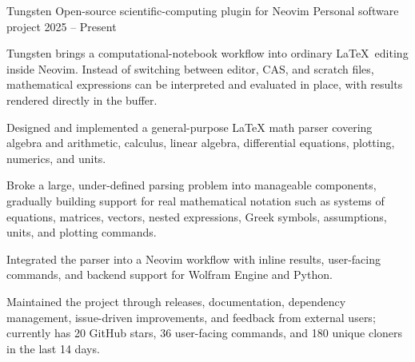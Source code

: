 \projectentry
  {Tungsten}
  {Open-source scientific-computing plugin for Neovim}
  {Personal software project}
  {2025 -- Present}
  {  \portfoliotag{\LaTeX}   }
  {\tungstenfigure}
  {Tungsten brings a computational-notebook workflow into ordinary \LaTeX\ editing inside Neovim. Instead of switching between editor, CAS, and scratch files, mathematical expressions can be interpreted and evaluated in place, with results rendered directly in the buffer.

  \begin{projectbullets}
    \item Designed and implemented a general-purpose LaTeX math parser covering algebra and arithmetic, calculus, linear algebra, differential equations, plotting, numerics, and units.
    \item Broke a large, under-defined parsing problem into manageable components, gradually building support for real mathematical notation such as systems of equations, matrices, vectors, nested expressions, Greek symbols, assumptions, units, and plotting commands.
    \item Integrated the parser into a Neovim workflow with inline results, user-facing commands, and backend support for Wolfram Engine and Python.
    \item Maintained the project through releases, documentation, dependency management, issue-driven improvements, and feedback from external users; currently has 20 GitHub stars, 36 user-facing commands, and 180 unique cloners in the last 14 days.
  \end{projectbullets}}

\projectseparator

